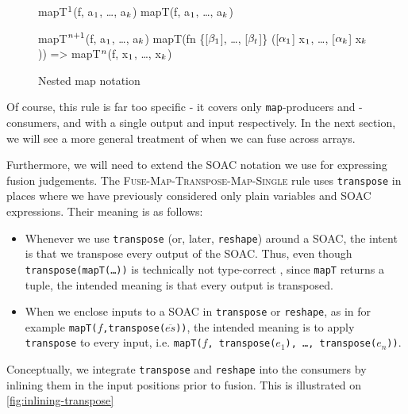 \begin{figure}
\begin{center}
\begin{colorcode}
mapT\(^{1}\)(f, a\(_{1}\), \ldots , a\(_{k}\)) \emphh{\(\equiv\)}
mapT(f, a\(_{1}\), \ldots, a\(_{k}\))

mapT\(^{n+1}\)(f, a\(_{1}\), \ldots, a\(_{k}\)) \emphh{\(\equiv\)}
mapT(fn \{[\(\beta_{1}\)], \ldots, [\(\beta_{t}\)]\} ([\(\alpha_{1}\)] x\(_{1}\), \ldots, [\(\alpha_{k}\)] x\(_{k}\))) =>
       mapT\(^{n}\)(f, x\(_{1}\), \ldots, x\(_{k}\))
\end{colorcode}
\end{center}
\caption{Nested map notation}
\label{fig:nested-maps}
\end{figure}

Of course, this rule is far too specific - it covers only
\texttt{map}-producers and -consumers, and with a single output and
input respectively.  In the next section, we will see a more general
treatment of when we can fuse across arrays.

Furthermore, we will need to extend the SOAC notation we use for
expressing fusion judgements.  The
\textsc{Fuse-Map-Transpose-Map-Single} rule uses \texttt{transpose} in
places where we have previously considered only plain variables and
SOAC expressions.  Their meaning is as follows:

\begin{itemize}
\item Whenever we use \texttt{transpose} (or, later, \texttt{reshape})
  around a SOAC, the intent is that we transpose every output of the
  SOAC.  Thus, even though \texttt{transpose(mapT(\ldots))} is
  technically not type-correct \LO{}, since \texttt{mapT} returns a
  tuple, the intended meaning is that every output is transposed.
\item When we enclose inputs to a SOAC in \texttt{transpose} or
  \texttt{reshape}, as in for example
  \texttt{mapT($f$,transpose($\overline{es}$))}, the intended meaning
  is to apply \texttt{transpose} to every input, i.e.
  \texttt{mapT($f$, transpose($e_{1}$), \ldots, transpose($e_{n}$))}.
\end{itemize}

Conceptually, we integrate \texttt{transpose} and \texttt{reshape}
into the consumers by inlining them in the input positions prior to
fusion.  This is illustrated on \cref{fig:inlining-transpose}

